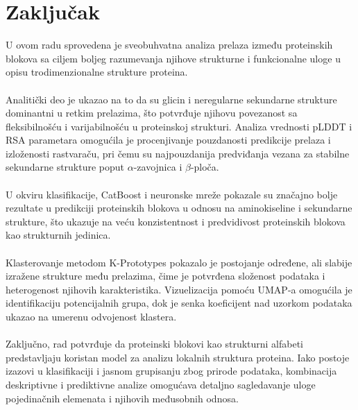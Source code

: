 \documentclass[a4paper,12pt]{article}
\begin{document}
\section{Zaključak}
U ovom radu sprovedena je sveobuhvatna analiza prelaza između proteinskih blokova sa ciljem boljeg razumevanja njihove strukturne i funkcionalne uloge u opisu trodimenzionalne strukture proteina.\\
\\
Analitički deo je ukazao na to da su glicin i neregularne sekundarne strukture dominantni u retkim prelazima, što potvrđuje njihovu povezanost sa fleksibilnošću i varijabilnošću u proteinskoj strukturi. Analiza vrednosti pLDDT i RSA parametara omogućila je procenjivanje pouzdanosti predikcije prelaza i izloženosti rastvaraču, pri čemu su najpouzdanija predviđanja vezana za stabilne sekundarne strukture poput $\alpha$-zavojnica i $\beta$-ploča.\\
\\
U okviru klasifikacije, CatBoost i neuronske mreže pokazale su značajno bolje rezultate u predikciji proteinskih blokova u odnosu na aminokiseline i sekundarne strukture, što ukazuje na veću konzistentnost i predvidivost proteinskih blokova kao strukturnih jedinica.\\
\\
Klasterovanje metodom K-Prototypes pokazalo je postojanje određene, ali slabije izražene strukture među prelazima, čime je potvrđena složenost podataka i heterogenost njihovih karakteristika. Vizuelizacija pomoću UMAP-a omogućila je identifikaciju potencijalnih grupa, dok je senka koeficijent nad uzorkom podataka ukazao na umerenu odvojenost klastera.\\
\\
Zaključno, rad potvrđuje da proteinski blokovi kao strukturni alfabeti predstavljaju koristan model za analizu lokalnih struktura proteina. Iako postoje izazovi u klasifikaciji i jasnom grupisanju zbog prirode podataka, kombinacija deskriptivne i prediktivne analize omogućava detaljno sagledavanje uloge pojedinačnih elemenata i njihovih međusobnih odnosa.
\end{document}
